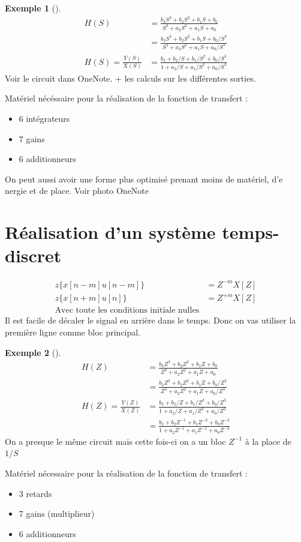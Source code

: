 \documentclass{article}
\theoremstyle{plain}%
\theoremstyle{definition}
\newtheorem{exmp}{Exemple}[section]
\theoremstyle{remark}
\begin{document}
\begin{exmp}[]
    \begin{align*}
        H(S) &= \frac{b_3 S^3 + b_2 S^2 + b_1S + b_0}{S^3 + a_2 S^2 + a_1 S + a_0} \\
            &= \frac{b_3 S^3 + b_2 S^2 + b_1S + b_0 / S^3}{S^3 + a_2 S^2 + a_1 S + a_0 / S^3} \\
        H(S) = \frac{Y(S)}{X(S)} &= \frac{b_3 + b_2/S + b_1/S^2 + b_0 /S^3}{1 + a_2/S + a_1/S^2 + a_0/S^3}
    \end{align*}
    Voir le circuit dans OneNote. + les calculs sur les différentes sorties.

    Matériel nécéssaire pour la réalisation de la fonction de transfert : 
    \begin{itemize}
        \item 6 intégrateurs
        \item 7 gains
        \item 6 additionneurs
    \end{itemize}

    On peut aussi avoir une forme plus optimisé prenant moins de matériel, d'e nergie et de place. Voir photo OneNote
\end{exmp}

\section{Réalisation d'un système temps-discret}
\begin{align*}
    z\{x[n-m]u[n-m]\} &= Z^{-m}X[Z] \\
    z\{x[n+m]u[n]\} &= Z^{+m}X[Z] \\
    \text{Avec toute les conditions initiale nulles}
\end{align*}
Il est facile de décaler le signal en arrière dans le temps. Donc on vas utiliser la première ligne comme bloc principal.

\begin{exmp}[]
    \begin{align*}
        H(Z) &= \frac{b_3 Z^3 + b_2 Z^2 + b_1Z + b_0}{Z^3 + a_2 Z^2 + a_1 Z + a_0} \\
        &= \frac{b_3 Z^3 + b_2 Z^2 + b_1Z + b_0 / Z^3}{Z^3 + a_2 Z^2 + a_1 Z + a_0 / Z^3} \\
        H(Z) = \frac{Y(Z)}{X(Z)} &= \frac{b_3 + b_2/Z + b_1/Z^2 + b_0 /Z^3}{1 + a_2/Z + a_1/Z^2 + a_0/Z^3} \\
        &= \frac{b_3 + b_2 Z^{-1} + b_1 Z^{-2} + b_0 Z^{-3}}{1 + a_2 Z^{-1} + a_1 Z^{-2} + a_0 Z^{-3}}
    \end{align*}
    On a presque le même circuit mais cette fois-ci on a un bloc $ Z^{-1} $ à la place de $ 1/S $ 
    
    Matériel nécessaire pour la réalisation de la fonction de transfert : 
    \begin{itemize}
        \item 3 retards
        \item 7 gains (multiplieur)
        \item 6 additionneurs
    \end{itemize}
\end{exmp}
\end{document}
